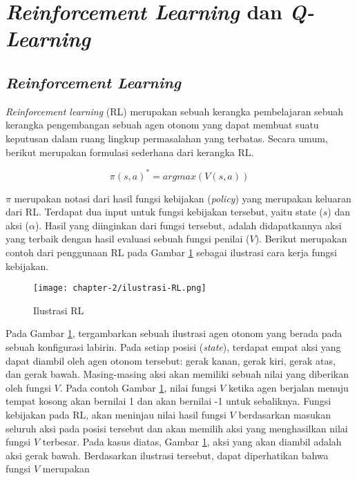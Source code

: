\section{\textit{Reinforcement Learning} dan \textit{Q-Learning}}
\subsection{\textit{Reinforcement Learning}}

\textit{Reinforcement learning} (RL) merupakan sebuah kerangka pembelajaran sebuah kerangka pengembangan sebuah agen otonom yang dapat membuat suatu keputusan dalam ruang lingkup permasalahan yang terbatas. Secara umum, berikut merupakan formulasi sederhana dari kerangka \ac{RL}.

\begin{equation}
	\pi(s,a)^* = argmax(V(s,a))
\end{equation}

\(\pi\) merupakan notasi dari hasil fungsi kebijakan (\textit{policy}) yang merupakan keluaran dari \ac{RL}. Terdapat dua input untuk fungsi kebijakan tersebut, yaitu state (\(s\)) dan aksi (\(\alpha\)). Hasil yang diinginkan dari fungsi tersebut, adalah didapatkannya aksi yang terbaik dengan hasil evaluasi sebuah fungsi penilai (\(V\)). Berikut merupakan contoh dari penggunaan \ac{RL} pada Gambar \ref{fig:ilustrasi-RL} sebagai ilustrasi cara kerja fungsi kebijakan.

\begin{figure}[h]
	\centering
	\texttt{[image: chapter-2/ilustrasi-RL.png]}
	\caption{Ilustrasi \ac{RL}}
	\label{fig:ilustrasi-RL}
\end{figure}


Pada Gambar \ref{fig:ilustrasi-RL}, tergambarkan sebuah ilustrasi agen otonom yang berada pada sebuah konfigurasi labirin. Pada setiap posisi (\textit{state}), terdapat empat aksi yang dapat diambil oleh agen otonom tersebut: gerak kanan, gerak kiri, gerak atas, dan gerak bawah. Masing-masing aksi akan memiliki sebuah nilai yang diberikan oleh fungsi \(V\). Pada contoh Gambar \ref{fig:ilustrasi-RL}, nilai fungsi \(V\) ketika agen berjalan menuju tempat kosong akan bernilai 1 dan akan bernilai -1 untuk sebaliknya. Fungsi kebijakan pada \ac{RL}, akan meninjau nilai hasil fungsi \(V\) berdasarkan masukan seluruh aksi pada posisi tersebut dan akan memilih aksi yang menghasilkan nilai fungsi \(V\) terbesar. Pada kasus diatas, Gambar \ref{fig:ilustrasi-RL}, aksi yang akan diambil adalah aksi gerak bawah. Berdasarkan ilustrasi tersebut, dapat diperhatikan bahwa fungsi \(V\) merupakan

